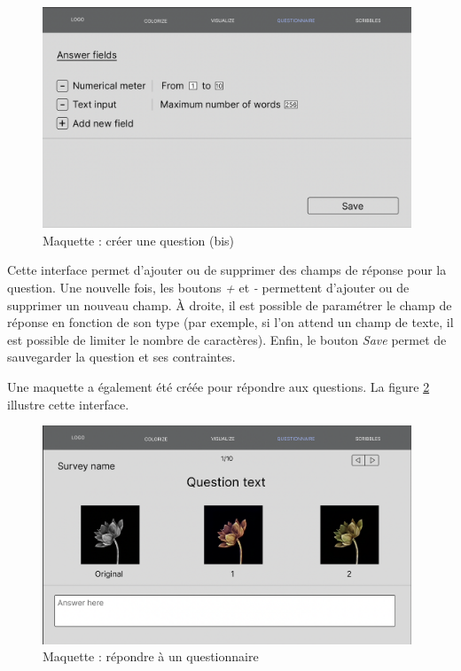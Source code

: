 \documentclass{article}
\begin{document}
\begin{figure}[!ht]
    \centering
    \includegraphics[width=11cm]{questionnaire-creation-question2.png}
    \caption{Maquette : créer une question (bis)}
    \label{fig:questionnaire-creation-question2}
\end{figure}

Cette interface permet d'ajouter ou de supprimer des champs de réponse pour la question.
Une nouvelle fois, les boutons \textit{+} et \textit{-} permettent d'ajouter ou de supprimer un nouveau champ.
À droite, il est possible de paramétrer le champ de réponse en fonction de son type (par exemple, si l'on attend un champ de texte, 
il est possible de limiter le nombre de caractères). Enfin, le bouton \textit{Save} permet de sauvegarder la question et ses contraintes.

Une maquette a également été créée pour répondre aux questions. La figure \ref{fig:questionnaire-repondre} illustre cette interface.

\begin{figure}[!ht]
    \centering
    \includegraphics[width=11cm]{questionnaire-repondre.png}
    \caption{Maquette : répondre à un questionnaire}
    \label{fig:questionnaire-repondre}
\end{figure}
\end{document}
